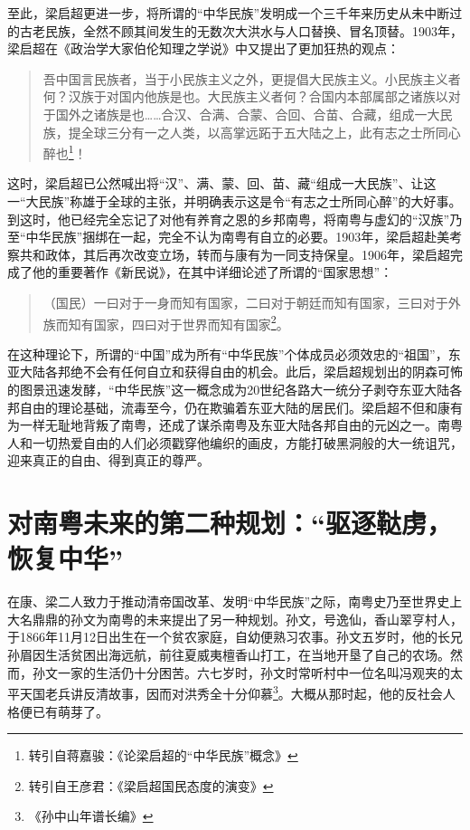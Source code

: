至此，梁启超更进一步，将所谓的“中华民族”发明成一个三千年来历史从未中断过的古老民族，全然不顾其间发生的无数次大洪水与人口替换、冒名顶替。1903年，梁启超在《政治学大家伯伦知理之学说》中又提出了更加狂热的观点：

\begin{quote}
吾中国言民族者，当于小民族主义之外，更提倡大民族主义。小民族主义者何？汉族于对国内他族是也。大民族主义者何？合国内本部属部之诸族以对于国外之诸族是也……合汉、合满、合蒙、合回、合苗、合藏，组成一大民族，提全球三分有一之人类，以高掌远跖于五大陆之上，此有志之士所同心醉也\footnote{转引自蒋嘉骏：《论梁启超的“中华民族”概念》}！
\end{quote}

这时，梁启超已公然喊出将“汉”、满、蒙、回、苗、藏“组成一大民族”、让这一“大民族”称雄于全球的主张，并明确表示这是令“有志之士所同心醉”的大好事。到这时，他已经完全忘记了对他有养育之恩的乡邦南粤，将南粤与虚幻的“汉族”乃至“中华民族”捆绑在一起，完全不认为南粤有自立的必要。1903年，梁启超赴美考察共和政体，其后再次改变立场，转而与康有为一同支持保皇。1906年，梁启超完成了他的重要著作《新民说》，在其中详细论述了所谓的“国家思想”：

\begin{quote}
（国民）一曰对于一身而知有国家，二曰对于朝廷而知有国家，三曰对于外族而知有国家，四曰对于世界而知有国家\footnote{转引自王彦君：《梁启超国民态度的演变》}。
\end{quote}

在这种理论下，所谓的“中国”成为所有“中华民族”个体成员必须效忠的“祖国”，东亚大陆各邦绝不会有任何自立和获得自由的机会。此后，梁启超规划出的阴森可怖的图景迅速发酵，“中华民族”这一概念成为20世纪各路大一统分子剥夺东亚大陆各邦自由的理论基础，流毒至今，仍在欺骗着东亚大陆的居民们。梁启超不但和康有为一样无耻地背叛了南粤，还成了谋杀南粤及东亚大陆各邦自由的元凶之一。南粤人和一切热爱自由的人们必须戳穿他编织的画皮，方能打破黑洞般的大一统诅咒，迎来真正的自由、得到真正的尊严。


\section{对南粤未来的第二种规划：“驱逐鞑虏，恢复中华”}

\indent 在康、梁二人致力于推动清帝国改革、发明“中华民族”之际，南粤史乃至世界史上大名鼎鼎的孙文为南粤的未来提出了另一种规划。孙文，号逸仙，香山翠亨村人，于1866年11月12日出生在一个贫农家庭，自幼便熟习农事。孙文五岁时，他的长兄孙眉因生活贫困出海远航，前往夏威夷檀香山打工，在当地开垦了自己的农场。然而，孙文一家的生活仍十分困苦。六七岁时，孙文时常听村中一位名叫冯观夹的太平天国老兵讲反清故事，因而对洪秀全十分仰慕\footnote{《孙中山年谱长编》}。大概从那时起，他的反社会人格便已有萌芽了。

